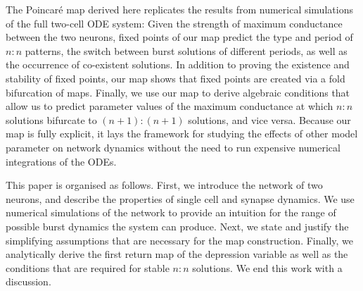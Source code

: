 The Poincaré map derived here replicates the results from numerical simulations of the
full two-cell ODE system: Given the strength of maximum conductance between the two
neurons, fixed points of our map predict the type and period of $n:n$ patterns, the switch
between burst solutions of different periods, as well as the occurrence of co-existent
solutions.
In addition to proving the existence and stability of fixed points, our map shows that fixed points are created via a fold bifurcation of maps.
Finally, we use our map to derive algebraic conditions that allow us to predict parameter values of the maximum conductance at which $n:n$ solutions bifurcate to $(n+1):(n+1)$ solutions, and vice versa.
Because our map is fully explicit, it lays the framework for studying the effects of other model parameter on network dynamics without the need to run expensive numerical integrations of the ODEs.

This paper is organised as follows.
First, we introduce the network of two neurons, and describe the properties of single cell and synapse dynamics.
We use numerical simulations of the network to provide an intuition for the range of possible burst dynamics the system can produce.
Next, we state and justify the simplifying assumptions that are necessary for the map construction.
Finally, we analytically derive the first return map of the depression variable as well as the conditions that are required for stable $n:n$ solutions.
We end this work with a discussion.
